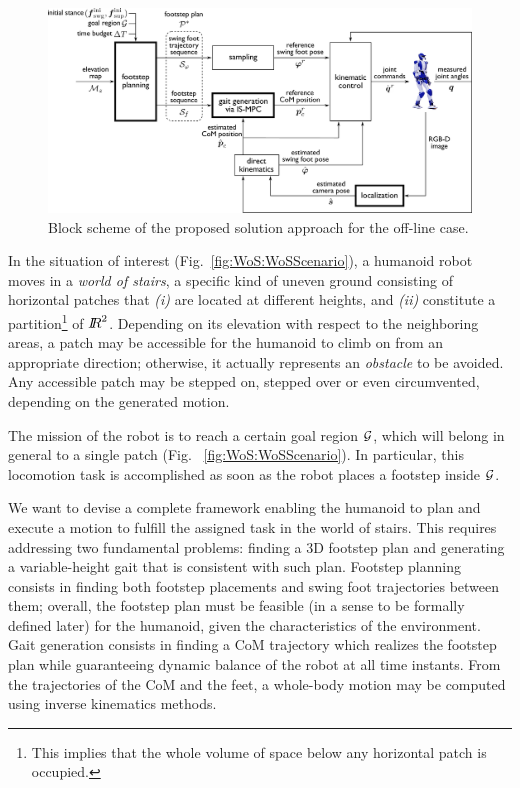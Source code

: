 \begin{figure}
\centering
\includegraphics[width=\textwidth]{figures/BlockSchemeOffline.pdf}
\caption{Block scheme of the proposed solution approach for the off-line case.}
\label{fig:WoS:blockScheme1}
\end{figure}

In the situation of interest (Fig.~\ref{fig:WoS:WoSScenario}), a humanoid robot moves in a {\em world of stairs}, a specific kind of uneven ground consisting of horizontal patches that {\em (i)} are located at different heights, and {\em (ii)} constitute a partition\footnote{This implies that the whole volume of space below any horizontal patch is occupied.} of ${I\!\!R}^2$. 
Depending on its elevation with respect to the neighboring areas, a patch may be accessible for the humanoid to climb on from an appropriate direction; otherwise, it actually represents an {\em obstacle} to be avoided. Any accessible patch may be stepped on, stepped over or even circumvented, depending on the generated motion.  

The mission of the robot is to reach a certain goal region $\cal G$, which will belong in general to a single patch (Fig.~ \ref{fig:WoS:WoSScenario}). In particular, this locomotion task is accomplished as soon as the robot places a footstep inside $\cal G$.

We want to devise a complete framework enabling the humanoid to plan and execute a motion to fulfill the assigned task in the world of stairs.
This requires addressing two fundamental problems: finding a 3D footstep plan and generating a variable-height gait that is consistent with such plan.
Footstep planning consists in finding both footstep placements and swing foot trajectories between them; overall, the footstep plan must be feasible (in a sense to be formally defined later) for the humanoid, given the characteristics of the environment. Gait generation consists in finding a CoM trajectory which realizes the footstep plan while guaranteeing dynamic balance of the robot at all time instants. From the trajectories of the CoM and the feet, a whole-body motion may be computed using inverse kinematics methods.

